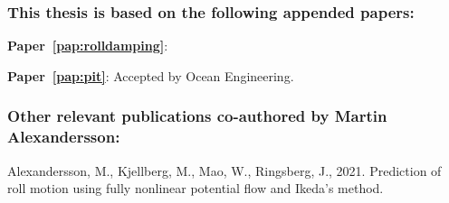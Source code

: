 

\subsubsection*{\normalfont \color{black} \textbf{This thesis is based on the following appended papers:}}

\noindent\begin{minipage}[adjusting]{\linewidth}
\textbf{Paper~\ref{pap:rolldamping}}: 
\end{minipage}
\vspace{0.25cm}
\newline
\noindent\begin{minipage}[adjusting]{\linewidth}
\textbf{Paper~\ref{pap:pit}}: 
Accepted by Ocean Engineering.
\end{minipage}
\clearpage
\subsubsection*{\normalfont \color{black} \textbf{Other relevant publications co-authored by Martin Alexandersson:}} 
\normalsize
\newcommand{\ME}{{\bfseries Martin Alexandersson}}

\noindent\begin{minipage}[adjusting]{\linewidth}
\end{minipage}
\vspace{0.25cm}
\newline
\noindent\begin{minipage}[adjusting]{\linewidth}
Alexandersson, M., Kjellberg, M., Mao, W., Ringsberg, J., 2021. Prediction of roll motion using fully nonlinear potential flow and Ikeda’s method.
\end{minipage}

